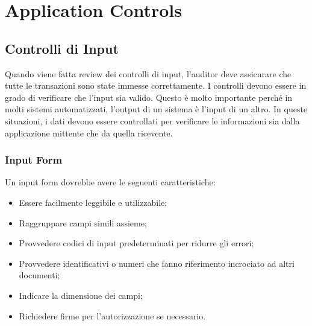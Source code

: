 \chapter{Application Controls}
\label{cs:ac}

\section{Controlli di Input}
Quando viene fatta review dei controlli di input, l'auditor deve
assicurare che tutte le transazioni sono state immesse correttamente.
I controlli devono essere in grado di verificare che l'input sia valido.
Questo è molto importante perché in molti sistemi automatizzati,
l'output di un sistema è l'input di un altro. In queste situazioni,
i dati devono essere controllati per verificare le informazioni sia
dalla applicazione mittente che da quella ricevente.

\subsection{Input Form}
Un input form dovrebbe avere le seguenti caratteristiche:
\begin{itemize}
\item Essere facilmente leggibile e utilizzabile;
\item Raggruppare campi simili assieme;
\item Provvedere codici di input predeterminati per ridurre
gli errori;
\item Provvedere identificativi o numeri che fanno riferimento
incrociato ad altri documenti;
\item Indicare la dimensione dei campi;
\item Richiedere firme per l'autorizzazione se necessario.
\end{itemize}

